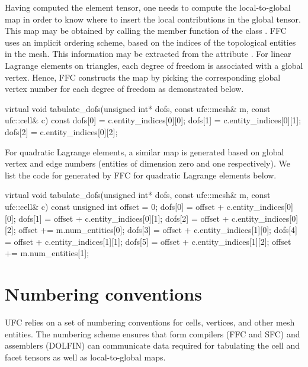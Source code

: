Having computed the element tensor, one needs to compute the
local-to-global map in order to know where to insert the local
contributions in the global tensor. This map may be obtained by
calling the member function  of the class
. FFC uses an implicit ordering scheme, based on the
indices of the topological entities in the mesh. This information may
be extracted from the  attribute .  For
linear Lagrange elements on triangles, each degree of freedom is
associated with a global vertex. Hence, FFC constructs the map by
picking the corresponding global vertex number for each degree of
freedom as demonstrated below.  {\scriptsize
\begin{code}
virtual void tabulate_dofs(unsigned int* dofs,
                           const ufc::mesh& m,
                           const ufc::cell& c) const
{
  dofs[0] = c.entity_indices[0][0];
  dofs[1] = c.entity_indices[0][1];
  dofs[2] = c.entity_indices[0][2];
}
\end{code}
}
For quadratic Lagrange elements, a similar map is generated based on
global vertex and edge numbers (entities of dimension zero and one
respectively). We list the code for  generated by
FFC for quadratic Lagrange elements below.  {\scriptsize
\begin{code}
virtual void tabulate_dofs(unsigned int* dofs,
                           const ufc::mesh& m,
                           const ufc::cell& c) const
{
  unsigned int offset = 0;
  dofs[0] = offset + c.entity_indices[0][0];
  dofs[1] = offset + c.entity_indices[0][1];
  dofs[2] = offset + c.entity_indices[0][2];
  offset += m.num_entities[0];
  dofs[3] = offset + c.entity_indices[1][0];
  dofs[4] = offset + c.entity_indices[1][1];
  dofs[5] = offset + c.entity_indices[1][2];
  offset += m.num_entities[1];
}
\end{code}
}

\section{Numbering conventions}
\label{sec:numbering}

UFC relies on a set of numbering conventions for cells, vertices, and
other mesh entities. The numbering scheme ensures that form compilers
(FFC and SFC) and assemblers (DOLFIN) can communicate data required
for tabulating the cell and facet tensors as well as local-to-global
maps.

